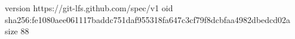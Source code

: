 version https://git-lfs.github.com/spec/v1
oid sha256:fe1080aee061117baddc751daf955318fa647c3cf79f8dcbfaa4982dbedcd02a
size 88

